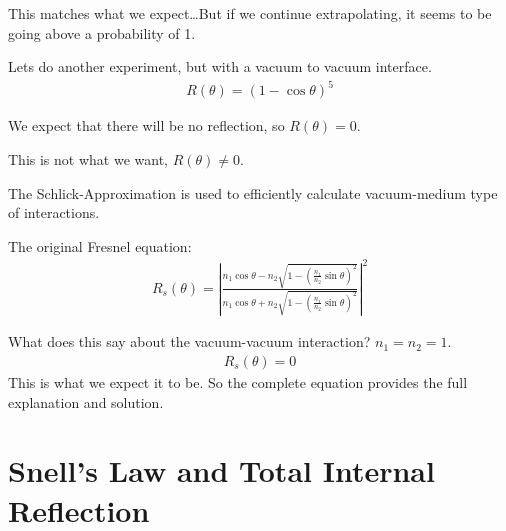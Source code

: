 \documentclass[10pt]{armath}
\numberwithin{equation}{section}
\newenvironment{Figure}
{\par\medskip\noindent\minipage{\linewidth}}
{\endminipage\par\medskip}
\theoremstyle{definition}
\begin{document}
\begin{multicols}{2}
  This matches what we expect\ldots But if we continue extrapolating, it seems
  to be going above a probability of 1.

  Lets do another experiment, but with a vacuum to vacuum interface.
  \begin{align*}
    R(\theta)={\left(1-\cos\theta\right)}^5
  \end{align*}

  We expect that there will be no reflection, so $R(\theta)=0$.

  \begin{Figure}
    \begin{center}
      
    \end{center}
    \label{fig:05_3}
  \end{Figure}

  This is not what we want, $R(\theta)\neq 0$.

  The Schlick-Approximation is used to efficiently calculate vacuum-medium type
  of interactions.

  The original Fresnel equation:
  \begin{align*}
    R_s(\theta)={\left|\frac{n_1\cos\theta-n_2\sqrt{1-{\left(\frac{n_1}{n_2}\sin\theta\right)}^2}}{n_1\cos\theta+n_2\sqrt{1-{\left(\frac{n_1}{n_2}\sin\theta\right)}^2}}\right|}^2
  \end{align*}

  What does this say about the vacuum-vacuum interaction?
  $n_1=n_2=1$.
  \begin{align*}
    R_s(\theta)=0
  \end{align*}
  This is what we expect it to be. So the complete equation provides the
  full explanation and solution.

  \section{Snell's Law and Total Internal Reflection}%
  \label{sec:snell_s_law_and_total_internal_reflection}
  
  

\end{multicols}
\end{document}
